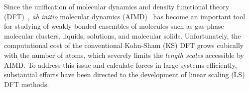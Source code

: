 \documentclass[aps,prl,reprint,amsmath,amssymb]{revtex4-1}
\begin{document}
\maketitle


Since the unification of molecular dynamics and density functional theory (DFT)~\cite{a:thecpmd},
\emph{ab initio} molecular dynamics (AIMD)~\cite{b:aimd} has become an important tool for studying of weakly bonded ensembles of molecules such as gas-phase molecular clusters, liquids, solutions, and molecular solids. %
Unfortunately, the computational cost of the conventional Kohn-Sham (KS) DFT grows cubically with the number of atoms, which severely limits the \emph{length scales} accessible by AIMD. %
To address this issue and calculate forces in large systems efficiently, substantial efforts have been directed to the development of linear scaling (LS) DFT methods.
\end{document}
